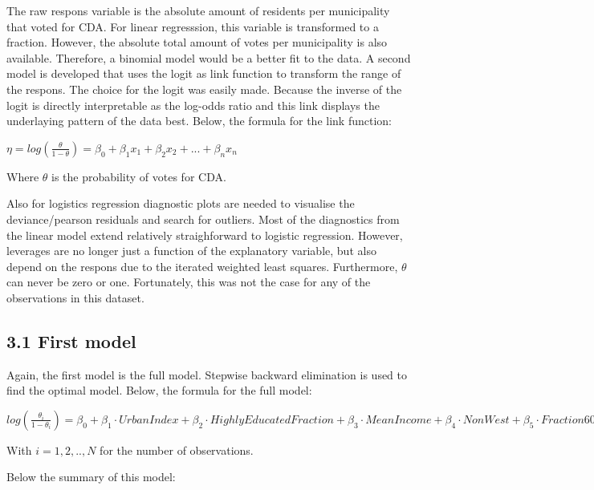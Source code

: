 \documentclass[11pt,]{article}
\begin{document}
The raw respons variable is the absolute amount of residents per
municipality that voted for CDA. For linear regresssion, this variable
is transformed to a fraction. However, the absolute total amount of
votes per municipality is also available. Therefore, a binomial model
would be a better fit to the data. A second model is developed that uses
the logit as link function to transform the range of the respons. The
choice for the logit was easily made. Because the inverse of the logit
is directly interpretable as the log-odds ratio and this link displays
the underlaying pattern of the data best. Below, the formula for the
link function:

\(\eta = log(\frac{\theta}{1 - \theta}) = \beta_0 + \beta_1 x_1 + \beta_2 x_2 + ... + \beta_n x_n\)

Where \(\theta\) is the probability of votes for CDA.

Also for logistics regression diagnostic plots are needed to visualise
the deviance/pearson residuals and search for outliers. Most of the
diagnostics from the linear model extend relatively straighforward to
logistic regression. However, leverages are no longer just a function of
the explanatory variable, but also depend on the respons due to the
iterated weighted least squares. Furthermore, \(\theta\) can never be
zero or one. Fortunately, this was not the case for any of the
observations in this dataset.

\subsection{3.1 First model}\label{first-model-1}

Again, the first model is the full model. Stepwise backward elimination
is used to find the optimal model. Below, the formula for the full
model:

\(log(\frac{\theta_i}{1 - \theta_i}) = \beta_0 + \beta_1 \cdot UrbanIndex + \beta_2 \cdot HighlyEducatedFraction + \beta_3 \cdot MeanIncome + \beta_4 \cdot NonWest + \beta_5 \cdot Fraction60Plus + \epsilon_i\)

With \(i = 1, 2,.., N\) for the number of observations.

Below the summary of this model:
\end{document}
